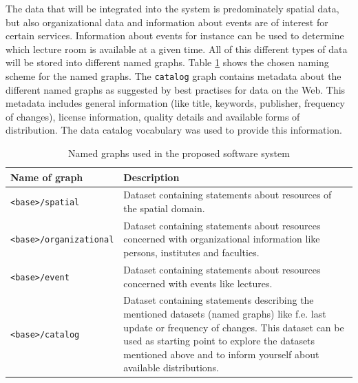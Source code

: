 \documentclass[draft,final]{vutinfth} %
\begin{document}
The data that will be integrated into the system is predominately spatial data, but also organizational data and information about events are of interest for certain services. Information about events for instance can be used to determine which lecture room is available at a given time. All of this different types of data will be stored into different named graphs. Table \ref{tab:architectural-prototype:named-graphs} shows the chosen naming scheme for the named graphs. The \texttt{catalog} graph contains metadata about the different named graphs as suggested by best practises for data on the Web\cite{w3c_data_2016}. This metadata includes general information (like title, keywords, publisher, frequency of changes), license information, quality details and available forms of distribution. The data catalog vocabulary\cite{maali_data_2014} was used to provide this information.

\begin{table}
  \centering
  \begin{tabular}{lp{7cm}}
    \toprule
    Name of graph & Description \\
    \midrule
    \texttt{<base>/spatial} & Dataset containing statements about resources of the spatial domain. \\
    \texttt{<base>/organizational} & Dataset containing statements about resources concerned with organizational information like persons, institutes and faculties. \\
    \texttt{<base>/event} & Dataset containing statements about resources concerned with events like lectures.\\
    \texttt{<base>/catalog} & Dataset containing statements describing the mentioned datasets (named graphs) like f.e. last update or frequency of changes. This dataset can be used as starting point to explore the datasets mentioned above and to inform yourself about available distributions.\\
    \bottomrule
  \end{tabular}
  \caption{Named graphs used in the proposed software system}
  \label{tab:architectural-prototype:named-graphs}
\end{table}
\end{document}
